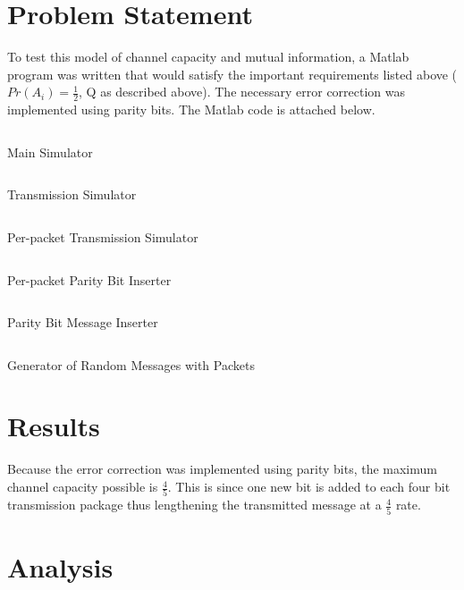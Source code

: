 \documentclass{article}
\begin{document}
   \section{Problem Statement}
      To test this model of channel capacity and mutual information,
      a Matlab program was written that would satisfy the important
      requirements listed above ($Pr(A_i) = \frac{1}{2}$, Q as described above).
      The necessary error correction was implemented using parity bits.
      The Matlab code is attached below.

      \begin{listing}[H]
         \inputminted[linenos]{matlab}{../main.m}
         \caption{Main Simulator}
      \end{listing}
      
      \begin{listing}[H]
         \inputminted[linenos]{matlab}{../transmit.m}
         \caption{Transmission Simulator}
      \end{listing}

      \begin{listing}[H]
         \inputminted[linenos]{matlab}{../transmit_msg.m}
         \caption{Per-packet Transmission Simulator}
      \end{listing}

      \begin{listing}[H]
         \inputminted[linenos]{matlab}{../insert_parity_bit.m}
         \caption{Per-packet Parity Bit Inserter}
      \end{listing}

      \begin{listing}[H]
         \inputminted[linenos]{matlab}{../parity.m}
         \caption{Parity Bit Message Inserter}
      \end{listing}

      \begin{listing}[H]
         \inputminted[linenos]{matlab}{../generate_random_msg.m}
         \caption{Generator of Random Messages with Packets}
      \end{listing}
   \section{Results}
      Because the error correction was implemented using parity bits,
      the maximum channel capacity possible is $\frac{4}{5}$. This is since
      one new bit is added to each four bit transmission package thus lengthening
      the transmitted message at a $\frac{4}{5}$ rate.
   \section{Analysis}
\end{document}
